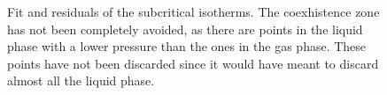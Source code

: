 \documentclass[a4paper, 11pt]{article}
\begin{document}




    \begin{figure}[H]
      \centering
       \hspace{-0.5cm}
      \caption{Fit and residuals of the subcritical isotherms. The coexhistence zone has not been completely avoided, as there are points in the liquid phase with a lower pressure than the ones in the gas phase. These points have not been discarded since it would have meant to discard almost all the liquid phase.}
      \label{fig:subcritical_fit_isotherms}
    \end{figure}
\end{document}
